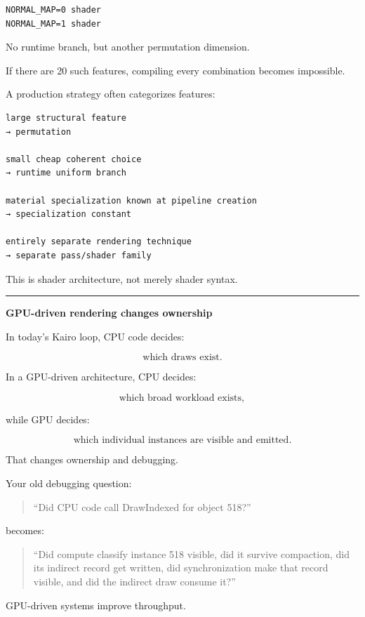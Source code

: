 \begin{verbatim}
NORMAL_MAP=0 shader
NORMAL_MAP=1 shader
\end{verbatim}

No runtime branch, but another permutation dimension.

If there are 20 such features, compiling every combination becomes impossible.

A production strategy often categorizes features:

\begin{verbatim}
large structural feature
→ permutation

small cheap coherent choice
→ runtime uniform branch

material specialization known at pipeline creation
→ specialization constant

entirely separate rendering technique
→ separate pass/shader family
\end{verbatim}

This is shader architecture, not merely shader syntax.

\begin{center}\rule{0.5\linewidth}{0.5pt}\end{center}

\textbf{GPU-driven rendering changes ownership}

In today's Kairo loop, CPU code decides:

\[
\text{which draws exist}.
\]

In a GPU-driven architecture, CPU decides:

\[
\text{which broad workload exists},
\]

while GPU decides:

\[
\text{which individual instances are visible and emitted}.
\]

That changes ownership and debugging.

Your old debugging question:

\begin{quote}
``Did CPU code call DrawIndexed for object 518?''
\end{quote}

becomes:

\begin{quote}
``Did compute classify instance 518 visible, did it survive compaction, did its indirect record get written, did synchronization make that record visible, and did the indirect draw consume it?''
\end{quote}

GPU-driven systems improve throughput.

